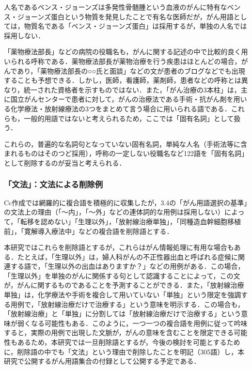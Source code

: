 \documentclass[japanese]{jnlp_1.4}
\begin{document}
人名であるベンス・ジョーンズは多発性骨髄腫という血液のがんに特有なベンス・ジョーンズ蛋白という物質を発見したことで有名な医師だが，がん用語としては，物質名である「ベンス・ジョーンズ蛋白」は採用するが，単独の人名では採用しない．

「薬物療法部長」などの病院の役職名も，がんに関する記述の中で比較的良く用いられる呼称である．薬物療法部長が薬物治療を行う疾患はほとんどの場合，がんであり，「薬物療法部長の○○氏と面談」などの文が患者のブログなどでも出現することも予想できる．しかし，医師，看護師，薬剤師，患者などの呼称とは異なり，統一された資格者を示すものではない．また，「がん治療の3本柱」は，主に国立がんセンターで患者に対して，がんの治療法である手術・抗がん剤を用いる化学療法・放射線療法の3つをまとめて言う場合に用いられる語である．これらも，一般的用語ではないと考えられるため，ここでは「固有名詞」として扱う．

これらの，普遍的な名詞句となっていない固有名詞，単純な人名（手術法等に含まれるものはそのつど採用），呼称の一定しない役職名など122語を「固有名詞」として削除するのが妥当と考えられる．


\subsubsection{「文法」：文法による削除例}
\label{s:「文法」：文法による削除例}

Cc作成では網羅的に複合語を積極的に収集したが，3.4の「がん用語選択の基準」の文法上の理由（「〜内」，「〜外」などの連体詞的な用例は採用しない）によって，「転移を認めない」「生理以外」，「放射線治療単独」，「同種造血幹細胞移植前」，「寛解導入療法中」などの複合語を削除語とする．

本研究ではこれらを削除語とするが，これらはがん情報処理に有用な場合もある．たとえば，「生理以外」は，婦人科がんの不正性器出血と呼ばれる症候に関連する語で，「生理以外の出血はありますか？」などの用例がある．この場合，「生理以外」を単独のがんに関係する句として認識することによって，この文が，がんに関するものであることを予測することができる．また，「放射線治療単独」は，化学療法や手術を複合して用いていない「単独」という限定を強調する用例で，「放射線治療だけで治療する」という意味を明示する．この場合も，「放射線治療」と「単独」に分割しては「放射線治療だけで治療する」という意味が弱くなる可能性もある．このように，一つ一つの複合語を用例に従って吟味すると，実際の用例で出現した文脈が，がんの意味を含むことを限定できる可能性もあるため，本研究では一旦削除語とするが，今後の検討を可能とするために，削除語の中でも「文法」という理由で削除したことを明記（305語）し，本研究で公開するがん用語集合の付録として公開する予定である．
\end{document}
